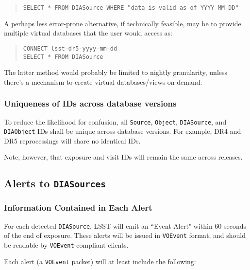 \documentclass[12pt]{article}
\newcommand{\code}[1]{\texttt{#1}}
\newcommand{\DIASource}{\code{DIASource}\xspace}
\newcommand{\DIASources}{\code{DIASources}\xspace}
\newcommand{\DIAObject}{\code{DIAObject}\xspace}
\newcommand{\Object}{\code{Object}\xspace}
\newcommand{\Source}{\code{Source}\xspace}
\newcommand{\VOEvent}{\code{VOEvent}\xspace}
\begin{document}
\begin{quote}
\code{SELECT * FROM DIASource WHERE ``data is valid as of YYYY-MM-DD"}
\end{quote}

A perhaps less error-prone alternative, if technically feasible, may be to provide multiple virtual databases that the user would access as:

\begin{quote}
\texttt{CONNECT lsst-dr5-yyyy-mm-dd} \\
\texttt{SELECT * FROM DIASource}
\end{quote}

The latter method would probably be limited to nightly granularity, unless there's a mechanism to create virtual databases/views on-demand.

\subsubsection{Uniqueness of IDs across database versions}

To reduce the likelihood for confusion, all \Source, \Object, \DIASource, and \DIAObject IDs shall be unique across database versions. For example, DR4 and DR5 reprocessings will share no identical IDs. 

Note, however, that exposure and visit IDs will remain the same across releases.

\subsection{Alerts to \DIASources}
\label{sec:voEventContents}

\subsubsection{Information Contained in Each Alert}

For each detected \DIASource, LSST will emit an ``Event Alert" within 60 seconds of the end of exposure. These alerts will be issued in \VOEvent format, and should be readable by \VOEvent-compliant clients.

\vspace{1em}
Each alert (a \VOEvent packet) will at least include the following:
\end{document}
